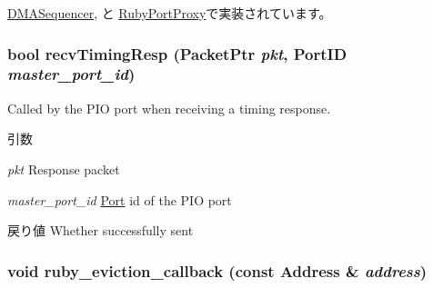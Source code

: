 \hyperlink{classDMASequencer_ae47593dc86baa86bf047ad1fbcdcceed}{DMASequencer}, と \hyperlink{classRubyPortProxy_ae47593dc86baa86bf047ad1fbcdcceed}{RubyPortProxy}で実装されています。\hypertarget{classRubyPort_a47ba09f9a3b3998cac9c14ab596a7515}{
\subsubsection[{recvTimingResp}]{\setlength{\rightskip}{0pt plus 5cm}bool recvTimingResp ({\bf PacketPtr} {\em pkt}, \/  {\bf PortID} {\em master\_\-port\_\-id})}}
\label{classRubyPort_a47ba09f9a3b3998cac9c14ab596a7515}
Called by the PIO port when receiving a timing response.


\begin{DoxyParams}{引数}
\item[{\em pkt}]Response packet \item[{\em master\_\-port\_\-id}]\hyperlink{classPort}{Port} id of the PIO port\end{DoxyParams}
\begin{DoxyReturn}{戻り値}
Whether successfully sent 
\end{DoxyReturn}
\hypertarget{classRubyPort_ac3858f72631784d3e09bba9070f96349}{
\subsubsection[{ruby\_\-eviction\_\-callback}]{\setlength{\rightskip}{0pt plus 5cm}void ruby\_\-eviction\_\-callback (const {\bf Address} \& {\em address})}}
\label{classRubyPort_ac3858f72631784d3e09bba9070f96349}



